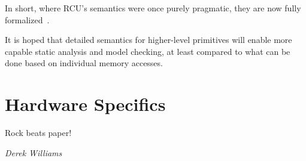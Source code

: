 \QuickQuizEnd

In short, where RCU's semantics were once purely pragmatic, they are
now fully
formalized~\cite{PaulMcKenney2005RCUSemantics,MathieuDesnoyers2012URCU,AlexeyGotsman2013ESOPRCU,Alglave:2018:FSC:3173162.3177156}.




It is hoped that detailed semantics for higher-level primitives will
enable more capable static analysis and model checking, at least compared
to what can be done based on individual memory accesses.

\section{Hardware Specifics}
\label{sec:memorder:Hardware Specifics}
%
\epigraph{Rock beats paper!}{\emph{Derek Williams}}

